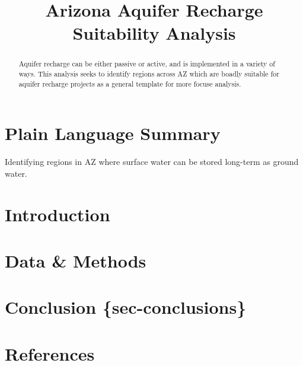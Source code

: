 \documentclass[
]{agujournal2019}
\newlength{\cslhangindent}
\newenvironment{CSLReferences}[2] %
 {\begin{list}{}{%
  \setlength{\itemindent}{0pt}
  \setlength{\leftmargin}{0pt}
  \setlength{\parsep}{0pt}
  \ifodd #1
   \setlength{\leftmargin}{\cslhangindent}
   \setlength{\itemindent}{-1\cslhangindent}
  \fi
  \setlength{\itemsep}{#2\baselineskip}}}
 {\end{list}}
\begin{document}
\title{Arizona Aquifer Recharge Suitability Analysis}



\begin{abstract}
Aquifer recharge can be either passive or active, and is implemented in
a variety of ways. This analysis seeks to identify regions across AZ
which are boadly suitable for aquifer recharge projects as a general
template for more focuse analysis.
\end{abstract}

\section*{Plain Language Summary}
Identifying regions in AZ where surface water can be stored long-term as
ground water.




\section{Introduction}\label{introduction}

\section{Data \& Methods}\label{sec-data-methods}

\section{Conclusion
\{sec-conclusions\}}\label{conclusion-sec-conclusions}

\section*{References}\label{references}

\label{refs}
\begin{CSLReferences}{0}{1}
\vspace{1em}

\end{CSLReferences}
\end{document}
